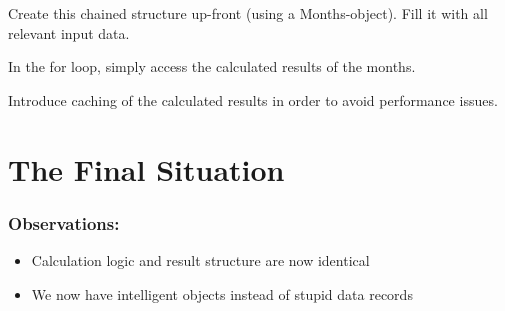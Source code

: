 \documentclass[a4paper,fleqn,titlepage,11pt]{article}
\begin{document}
Create this chained structure up-front (using a Months-object). Fill it with all relevant input data.

In the for loop, simply access the calculated results of the months.

Introduce caching of the calculated results in order to avoid performance issues.


\section{The Final Situation}

\subsubsection*{Observations:}

\begin{itemize}
\item Calculation logic and result structure are now identical
\item We now have intelligent objects instead of stupid data records
\end{itemize}
\end{document}

